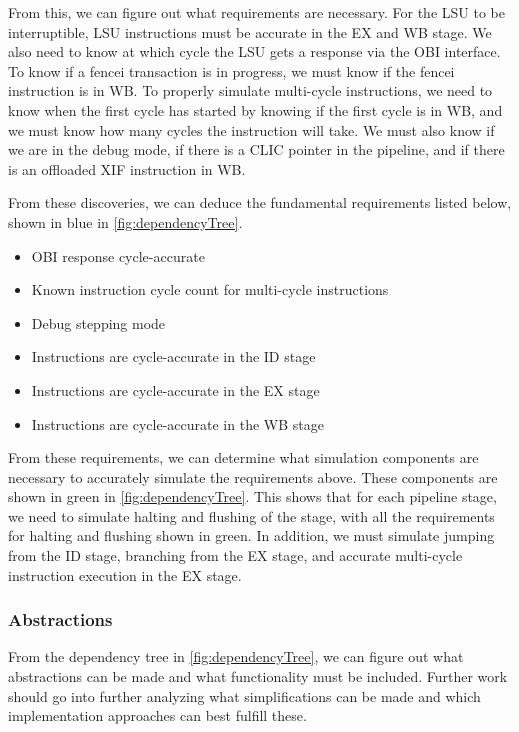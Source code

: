 From this, we can figure out what requirements are necessary. For the LSU to be interruptible, LSU instructions must be accurate in the EX and WB stage. We also need to know at which cycle the LSU gets a response via the OBI interface.
To know if a fencei transaction is in progress, we must know if the fencei instruction is in WB. To properly simulate multi-cycle instructions, we need to know when the first cycle has started by knowing if the first cycle is in WB, and we must know how many cycles the instruction will take. We must also know if we are in the debug mode, if there is a CLIC pointer in the pipeline, and if there is an offloaded XIF instruction in WB.

From these discoveries, we can deduce the fundamental requirements listed below, shown in blue in \cref{fig:dependencyTree}.
\begin{itemize}
    \item OBI response cycle-accurate
    \item Known instruction cycle count for multi-cycle instructions
    \item Debug stepping mode
    \item Instructions are cycle-accurate in the ID stage
    \item Instructions are cycle-accurate in the EX stage
    \item Instructions are cycle-accurate in the WB stage
\end{itemize}

From these requirements, we can determine what simulation components are necessary to accurately simulate the requirements above. These components are shown in green in \cref{fig:dependencyTree}. This shows that for each pipeline stage, we need to simulate halting and flushing of the stage, with all the requirements for halting and flushing shown in green. In addition, we must simulate jumping from the ID stage, branching from the EX stage, and accurate multi-cycle instruction execution in the EX stage.

\subsubsection{Abstractions}

From the dependency tree in \cref{fig:dependencyTree}, we can figure out what abstractions can be made and what functionality must be included. Further work should go into further analyzing what simplifications can be made and which implementation approaches can best fulfill these.

